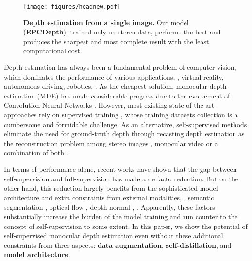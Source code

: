 \documentclass[10pt,twocolumn,letterpaper]{article}
\begin{document}
\begin{figure}[t]
   \begin{center}
      \texttt{[image: figures/headnew.pdf]}
   \end{center}
      \caption{{\bf Depth estimation from a single image.} Our model ({\bf EPCDepth}), 
      trained only on stereo data, performs the best and produces the sharpest and most 
      complete result with the least computational cost.}
   \label{fig:head}
\end{figure}

Depth estimation has always been a fundamental problem of computer vision, which 
dominates the performance of various applications, \eg, virtual reality, autonomous 
driving, robotics, \etc. As the cheapest solution, monocular depth estimation (MDE) 
has made considerable progress due to the evolvement of Convolution Neural 
Networks \cite{Krizhevsky2012,Simonyan2015,Szegedy2015,He2016}.  
However, most existing state-of-the-art approaches rely on supervised training 
\cite{Eigen2014,Eigen2015,Fu2018,Lasinger2020,bhat2021adabins}, 
whose training datasets collection is a cumbersome and formidable challenge. 
As an alternative, self-supervised methods eliminate the need for ground-truth 
depth through recasting depth estimation as the reconstruction problem among stereo 
images \cite{Garg2016,Godard2017,Watson2019,Zhu2020}, monocular 
video \cite{Zhou2017,Chen2019,Shu2020,Lyu2021} or a combination of 
both \cite{Zhan2018,Godard2019}.

In terms of performance alone, recent works have shown that the gap between 
self-supervision and full-supervision has made a de facto reduction. 
But on the other hand, this reduction largely benefits from the sophisticated model 
architecture and extra constraints from external modalities, \eg, 
semantic segmentation \cite{Chen2019,Klingner2020,Zhu2020,Guizilini2020Sem}, 
optical flow \cite{Yin2018,Ranjan2019}, depth normal \cite{Yang2018}, \etc. 
Apparently, these factors substantially increase the burden of the model 
training and run counter to the concept of self-supervision to some extent. 
In this paper, we show the potential of self-supervised monocular depth 
estimation even without these additional constraints from three aspects: 
{\bf data augmentation}, {\bf self-distillation}, and {\bf model architecture}.
\end{document}
